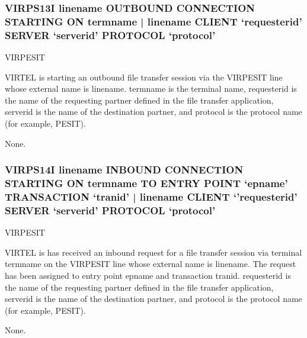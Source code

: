 \documentclass[letterpaper,10pt,english]{sphinxmanual}
\begin{document}
\subsubsection{VIRPS13I linename OUTBOUND CONNECTION STARTING ON termname | linename CLIENT ‘requesterid’ SERVER ‘serverid’ PROTOCOL ‘protocol’}
\label{\detokenize{messages:virps13i-linename-outbound-connection-starting-on-termname-linename-client-requesterid-server-serverid-protocol-protocol}}\begin{description}
\sphinxAtStartPar
VIRPESIT

\sphinxAtStartPar
VIRTEL is starting an outbound file transfer session via the VIRPESIT line whose external name is linename. termname is the terminal name, requesterid is the name of the requesting partner defined in the file transfer application, serverid is the name of the destination partner, and protocol is the protocol name (for example, PESIT).

\sphinxAtStartPar
None.

\end{description}


\subsubsection{VIRPS14I linename INBOUND CONNECTION STARTING ON termname TO ENTRY POINT ‘epname’ TRANSACTION ‘tranid’ | linename CLIENT ‘’requesterid’ SERVER ‘serverid’ PROTOCOL ‘protocol’}
\label{\detokenize{messages:virps14i-linename-inbound-connection-starting-on-termname-to-entry-point-epname-transaction-tranid-linename-client-requesterid-server-serverid-protocol-protocol}}\begin{description}
\sphinxAtStartPar
VIRPESIT

\sphinxAtStartPar
VIRTEL is has received an inbound request for a file transfer session via terminal termname on the VIRPESIT line whose external name is linename. The request has been assigned to entry point epname and transaction tranid. requesterid is the name of the requesting partner defined in the file transfer application, serverid is the name of the destination partner, and protocol is the protocol name (for example, PESIT).

\sphinxAtStartPar
None.

\end{description}
\end{document}

